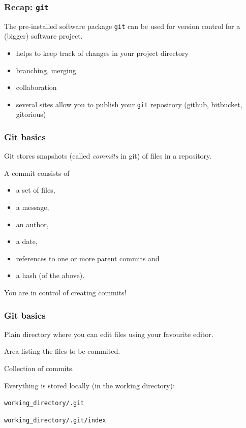 \documentclass{beamer}
\begin{document}
\begin{frame}
\frametitle{Recap: \texttt{git}}
The pre-installed software package \texttt{git} can be used for version control for a (bigger) software project.
\begin{itemize}
 \item helps to keep track of changes in your project directory
 \item branching, merging
 \item collaboration
 \item several sites allow you to publish your \texttt{git} repository (github, bitbucket, gitorious) 
\end{itemize}
\end{frame}

\begin{frame}
\frametitle{Git basics}
Git stores snapshots (called \emph{commits} in git) of files in a repository.

A commit consists of
\begin{itemize}
 \item a set of files,
 \item a message,
 \item an author,
 \item a date,
 \item references to one or more parent commits and
 \item a hash (of the above).
\end{itemize}

You are in control of creating commits!
\end{frame}

\begin{frame}[fragile]
\frametitle{Git basics}
\begin{description}
 \item[working directory]
  Plain directory where you can edit files using your favourite editor.
 \item[staging area]
  Area listing the files to be commited.
 \item[repository]
  Collection of commits.
\end{description}

Everything is stored locally (in the working directory):
\begin{description}
 \item[repository] \verb|working_directory/.git|
 \item[staging area] \verb|working_directory/.git/index|
\end{description}
\end{frame}
\end{document}
